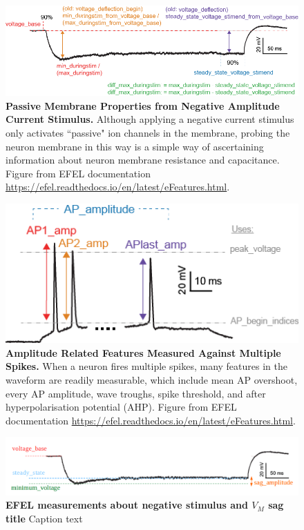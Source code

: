 \begin{figure}
\centering
\includegraphics{figures/voltage_features.png}
\caption[Passive Membrane Properties from Negative Amplitude Current Stimulus]{\textbf{Passive Membrane Properties from Negative Amplitude Current Stimulus.} Although applying a negative current stimulus only activates ``passive" ion channels in the membrane, probing the neuron membrane in this way is a simple way of ascertaining information about neuron membrane resistance and capacitance. Figure from EFEL documentation \url{https://efel.readthedocs.io/en/latest/eFeatures.html}.}
\label{fig:voltage_figures}
\end{figure}

\begin{figure}
\centering
\includegraphics{figures/AP_Amplitude.png}
\caption[Amplitude Features Measured Against Multiple Spikes]{\textbf{Amplitude Related Features Measured Against Multiple Spikes.} When a neuron fires multiple spikes, many features in the waveform are readily measurable, which include mean AP overshoot, every AP amplitude, wave troughs, spike threshold, and after hyperpolarisation potential (AHP). Figure from EFEL documentation \url{https://efel.readthedocs.io/en/latest/eFeatures.html}.
    }
\label{fig:features_example}
\end{figure}

\begin{figure}
\begin{center}
\includegraphics{figures/sag_amplitude}
\end{center}
\caption[EFEL measurements about negative stimulus and $V_{M}$ sag]{\textbf{EFEL measurements about negative stimulus and $V_{M}$ sag title} Caption text}
\label{fig:sag_amplitude}
\end{figure}

